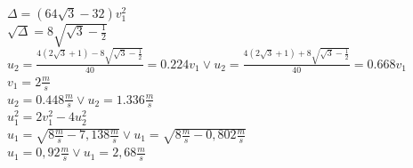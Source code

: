 \documentclass[14pt]{extarticle}
\begin{document}
        $\Delta = \left(64\sqrt{{3}}-32\right)v_1^2 $\\
        $\sqrt{{\Delta}} = 8\sqrt{{\sqrt{3}-\frac{1}{2}}} $\\
        $u_2 = \frac{4\left(2\sqrt{3}+1\right)-8\sqrt{{\sqrt{3}-\frac{1}{2}}}}{40}=0.224v_1 \lor
        u_2 = \frac{4\left(2\sqrt{3}+1\right)+8\sqrt{{\sqrt{3}-\frac{1}{2}}}}{40}=0.668v_1$ \\
        $v_1=2 \frac{m}{s}$\\
        $u_2 = 0.448\frac{m}{s} \lor u_2 = 1.336\frac{m}{s}$\\
        $u_1^2=2v_1^2-4u_2^2$\\
        $u_1=\sqrt{8\frac{m}{s}-7,138\frac{m}{s}} \lor u_1=\sqrt{8\frac{m}{s}-0,802\frac{m}{s}}$\\
        $u_1=0,92\frac{m}{s} \lor u_1=2,68\frac{m}{s}$\\
       
       
\end{document}
